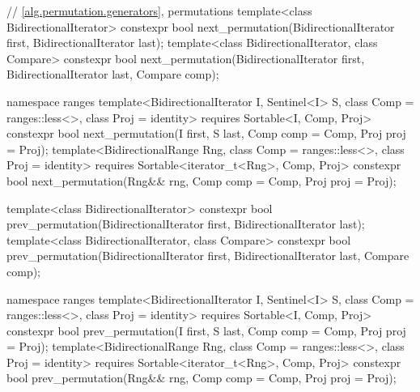 \begin{codeblock}
  // \ref{alg.permutation.generators}, permutations
  template<class BidirectionalIterator>
    constexpr bool next_permutation(BidirectionalIterator first,
                                    BidirectionalIterator last);
  template<class BidirectionalIterator, class Compare>
    constexpr bool next_permutation(BidirectionalIterator first,
                                    BidirectionalIterator last, Compare comp);
\end{codeblock}\begin{addedblock}\begin{codeblock}
  namespace ranges {
    template<BidirectionalIterator I, Sentinel<I> S, class Comp = ranges::less<>,
        class Proj = identity>
      requires Sortable<I, Comp, Proj>
      constexpr bool
        next_permutation(I first, S last, Comp comp = Comp{}, Proj proj = Proj{});
    template<BidirectionalRange Rng, class Comp = ranges::less<>,
        class Proj = identity>
      requires Sortable<iterator_t<Rng>, Comp, Proj>
      constexpr bool
        next_permutation(Rng&& rng, Comp comp = Comp{}, Proj proj = Proj{});
  }
\end{codeblock}\end{addedblock}\begin{codeblock}
  template<class BidirectionalIterator>
    constexpr bool prev_permutation(BidirectionalIterator first,
                                    BidirectionalIterator last);
  template<class BidirectionalIterator, class Compare>
    constexpr bool prev_permutation(BidirectionalIterator first,
                                    BidirectionalIterator last, Compare comp);
\end{codeblock}\begin{addedblock}\begin{codeblock}
  namespace ranges {
    template<BidirectionalIterator I, Sentinel<I> S, class Comp = ranges::less<>,
        class Proj = identity>
      requires Sortable<I, Comp, Proj>
      constexpr bool
        prev_permutation(I first, S last, Comp comp = Comp{}, Proj proj = Proj{});
    template<BidirectionalRange Rng, class Comp = ranges::less<>,
        class Proj = identity>
      requires Sortable<iterator_t<Rng>, Comp, Proj>
      constexpr bool
        prev_permutation(Rng&& rng, Comp comp = Comp{}, Proj proj = Proj{});
  }
\end{codeblock}\end{addedblock}\begin{codeblock}
}
\end{codeblock}

